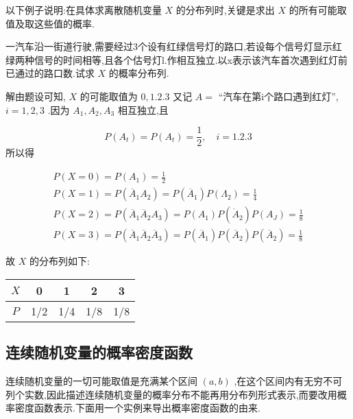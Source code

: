 以下例子说明:在具体求离散随机变量 $ X $ 的分布列时,关键是求出 $ X $ 的所有可能取值及取这些值的概率.

\begin{example}
	一汽车沿一街道行驶,需要经过3个设有红绿信号灯的路口,若设每个信号灯显示红绿两种信号的时间相等,且各个估号灯l.作相互独立.以x表示该汽车首次遇到红灯前已通过的路口数.试求 $ X $ 的概率分布列.
	
	解由题设可知, $ X $ 的可能取值为 $ 0,1.2.3 $ 又记 $ A= $ “汽车在第i个路口遇到红灯”, $ i=1,2,3 $ .因为 $ A_1,A_2,A_3 $ 相互独立,且
	
	\[ 
	P\left(A_{t}\right)=P\left(A_{t}\right)=\frac{1}{2}, \quad i=1.2 .3
	\]
	所以得
	
	\[ 
	\begin{array}{l}
	{P(X=0)=P\left(A_{1}\right)=\frac{1}{2}} \\ 
	{P(X=1)=P\left(\overline{A}_{1} A_{2}\right)=P\left(\overline{A}_{1}\right) P\left(\Lambda_{2}\right)=\frac{1}{4}} \\ 
	{P(X=2)=P\left(\overline{A}_{1} \overline{A}_{2} A_{3}\right)=P\left(A_{1}\right) P\left(\dot{A}_{2}\right) P\left(A_{J}\right)=\frac{1}{8}}\\
	{P(X=3)=P\left(\overline{A}_{1} \overline{A}_{2} \overline{A}_{3}\right)=P\left(\overline{A}_{1}\right) P\left(\overline{A}_{2}\right) P\left(\overline{A}_{2}\right)=\frac{1}{8}}
	\end{array}
	\]
	
	故 $ X $ 的分布列如下:
	
	\begin{table}[htbp]
		\centering
		\begin{tabular}{c|cccc}
			 $ X $ & 0     & 1     & 2     & 3 \\\midrule
			 $ P $ & 1/2   & 1/4   & 1/8   & 1/8 \\
		\end{tabular}%
	\end{table}%
	
\end{example}

\subsection{连续随机变量的概率密度函数}

连续随机变量的一切可能取值是充满某个区间 $ (a,b) $ ,在这个区间内有无穷不可列个实数,因此描述连续随机变量的概率分布不能再用分布列形式表示,而要改用概率密度函数表示.下面用一个实例来导出概率密度函数的由来.

